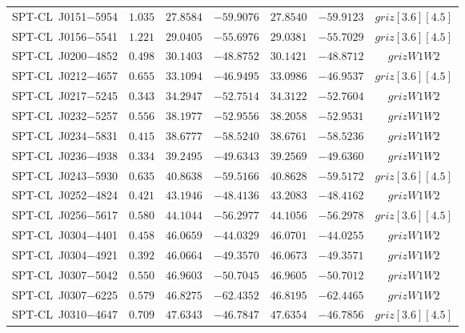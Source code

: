 \begin{table}
{\begin{tabular}{ccccccc}
    SPT-CL~J0151$-$5954    &$ 1.035 $    &$ 27.8584 $    &$ -59.9076 $     &$ 27.8540 $    &$ -59.9123 $     & $griz[3.6][4.5]$    \\ 
    SPT-CL~J0156$-$5541    &$ 1.221 $    &$ 29.0405 $    &$ -55.6976 $     &$ 29.0381 $    &$ -55.7029 $     & $griz[3.6][4.5]$    \\ 
    SPT-CL~J0200$-$4852    &$ 0.498 $    &$ 30.1403 $    &$ -48.8752 $     &$ 30.1421 $    &$ -48.8712 $     & $grizW1W2$    \\ 
    SPT-CL~J0212$-$4657    &$ 0.655 $    &$ 33.1094 $    &$ -46.9495 $     &$ 33.0986 $    &$ -46.9537 $     & $griz[3.6][4.5]$    \\ 
    SPT-CL~J0217$-$5245    &$ 0.343 $    &$ 34.2947 $    &$ -52.7514 $     &$ 34.3122 $    &$ -52.7604 $     & $grizW1W2$    \\ 
    SPT-CL~J0232$-$5257    &$ 0.556 $    &$ 38.1977 $    &$ -52.9556 $     &$ 38.2058 $    &$ -52.9531 $     & $grizW1W2$    \\ 
    SPT-CL~J0234$-$5831    &$ 0.415 $    &$ 38.6777 $    &$ -58.5240 $     &$ 38.6761 $    &$ -58.5236 $     & $grizW1W2$    \\ 
    SPT-CL~J0236$-$4938    &$ 0.334 $    &$ 39.2495 $    &$ -49.6343 $     &$ 39.2569 $    &$ -49.6360 $     & $grizW1W2$    \\ 
    SPT-CL~J0243$-$5930    &$ 0.635 $    &$ 40.8638 $    &$ -59.5166 $     &$ 40.8628 $    &$ -59.5172 $     & $griz[3.6][4.5]$    \\ 
    SPT-CL~J0252$-$4824    &$ 0.421 $    &$ 43.1946 $    &$ -48.4136 $     &$ 43.2083 $    &$ -48.4162 $     & $grizW1W2$    \\ 
    SPT-CL~J0256$-$5617    &$ 0.580 $    &$ 44.1044 $    &$ -56.2977 $     &$ 44.1056 $    &$ -56.2978 $     & $griz[3.6][4.5]$    \\ 
    SPT-CL~J0304$-$4401    &$ 0.458 $    &$ 46.0659 $    &$ -44.0329 $     &$ 46.0701 $    &$ -44.0255 $     & $grizW1W2$    \\ 
    SPT-CL~J0304$-$4921    &$ 0.392 $    &$ 46.0664 $    &$ -49.3570 $     &$ 46.0673 $    &$ -49.3571 $     & $grizW1W2$    \\ 
    SPT-CL~J0307$-$5042    &$ 0.550 $    &$ 46.9603 $    &$ -50.7045 $     &$ 46.9605 $    &$ -50.7012 $     & $grizW1W2$    \\ 
    SPT-CL~J0307$-$6225    &$ 0.579 $    &$ 46.8275 $    &$ -62.4352 $     &$ 46.8195 $    &$ -62.4465 $     & $grizW1W2$    \\ 
    SPT-CL~J0310$-$4647    &$ 0.709 $    &$ 47.6343 $    &$ -46.7847 $     &$ 47.6354 $    &$ -46.7856 $     & $griz[3.6][4.5]$    \\ 

\end{tabular}}
\end{table}
